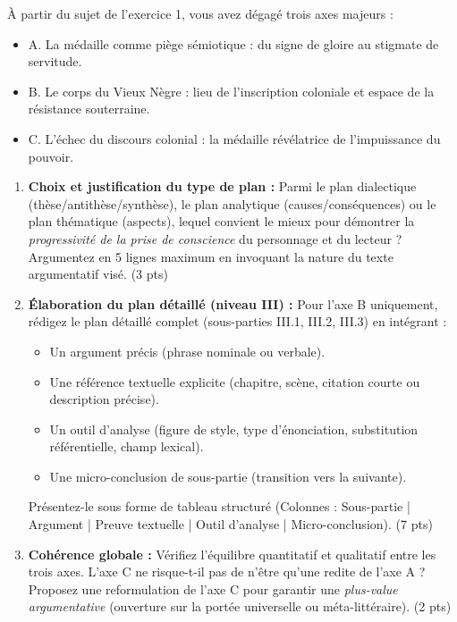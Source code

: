 \documentclass[11pt]{article}
\begin{document}
\begin{exercice}
À partir du sujet de l'exercice 1, vous avez dégagé trois axes majeurs : 
\begin{itemize}
    \item A. La médaille comme piège sémiotique : du signe de gloire au stigmate de servitude.
    \item B. Le corps du Vieux Nègre : lieu de l'inscription coloniale et espace de la résistance souterraine.
    \item C. L'échec du discours colonial : la médaille révélatrice de l'impuissance du pouvoir.
\end{itemize}

\begin{enumerate}
    \item \textbf{Choix et justification du type de plan :} Parmi le plan dialectique (thèse/antithèse/synthèse), le plan analytique (causes/conséquences) ou le plan thématique (aspects), lequel convient le mieux pour démontrer la \textit{progressivité de la prise de conscience} du personnage et du lecteur ? Argumentez en 5 lignes maximum en invoquant la nature du texte argumentatif visé. (3 pts)
    \item \textbf{Élaboration du plan détaillé (niveau III) :} Pour l'axe B uniquement, rédigez le plan détaillé complet (sous-parties III.1, III.2, III.3) en intégrant : 
    \begin{itemize}
        \item Un argument précis (phrase nominale ou verbale).
        \item Une référence textuelle explicite (chapitre, scène, citation courte ou description précise).
        \item Un outil d'analyse (figure de style, type d'énonciation, substitution référentielle, champ lexical).
        \item Une micro-conclusion de sous-partie (transition vers la suivante).
    \end{itemize}
    Présentez-le sous forme de tableau structuré (Colonnes : Sous-partie | Argument | Preuve textuelle | Outil d'analyse | Micro-conclusion). (7 pts)
    \item \textbf{Cohérence globale :} Vérifiez l'équilibre quantitatif et qualitatif entre les trois axes. L'axe C ne risque-t-il pas de n'être qu'une redite de l'axe A ? Proposez une reformulation de l'axe C pour garantir une \textit{plus-value argumentative} (ouverture sur la portée universelle ou méta-littéraire). (2 pts)
\end{enumerate}
\end{exercice}
\end{document}
